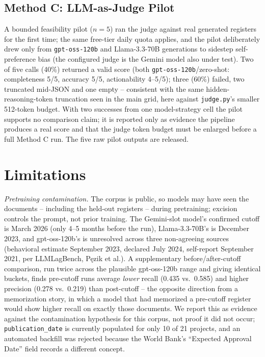 \documentclass[10pt, conference, letterpaper]{IEEEtran}
\begin{document}
\subsection{Method C: LLM-as-Judge Pilot}
A bounded feasibility pilot ($n=5$) ran the judge against real generated
registers for the first time; the same free-tier daily quota applies, and
the pilot deliberately drew only from \texttt{gpt-oss-120b} and
Llama-3.3-70B generations to sidestep self-preference bias (the configured
judge is the Gemini model also under test). Two of five calls (40\%)
returned a valid score (both \texttt{gpt-oss-120b}/zero-shot: completeness
5/5, accuracy 5/5, actionability 4--5/5); three (60\%) failed, two
truncated mid-JSON and one empty -- consistent with the same
hidden-reasoning-token truncation seen in the main grid, here against
\texttt{judge.py}'s smaller 512-token budget. With two successes from one
model-strategy cell the pilot supports no comparison claim; it is reported
only as evidence the pipeline produces a real score and that the judge
token budget must be enlarged before a full Method C run. The five raw
pilot outputs are released.

\section{Limitations}
\label{sec:limitations}

\textit{Pretraining contamination.} The corpus is public, so models may
have seen the documents -- including the held-out registers -- during
pretraining; excision controls the prompt, not prior training. The
Gemini-slot model's confirmed cutoff is March 2026 (only 4--5 months before
the run), Llama-3.3-70B's is December 2023, and gpt-oss-120b's is
unresolved across three non-agreeing sources (behavioral estimate September
2023, declared July 2024, self-report September 2021, per LLMLagBench,
P\k{e}zik et al.). A supplementary before/after-cutoff comparison, run
twice across the plausible gpt-oss-120b range and giving identical buckets,
finds pre-cutoff runs average \emph{lower} recall (0.435 vs.\ 0.585) and
higher precision (0.278 vs.\ 0.219) than post-cutoff -- the opposite
direction from a memorization story, in which a model that had memorized a
pre-cutoff register would show higher recall on exactly those documents. We
report this as evidence against the contamination hypothesis for this
corpus, not proof it did not occur; \texttt{publication\_date} is currently
populated for only 10 of 21 projects, and an automated backfill was
rejected because the World Bank's ``Expected Approval Date'' field records
a different concept.
\end{document}
